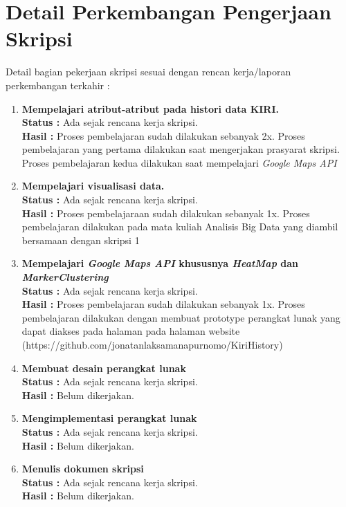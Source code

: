 \documentclass[a4paper,twoside]{article}
\begin{document}
\section{Detail Perkembangan Pengerjaan Skripsi}
Detail bagian pekerjaan skripsi sesuai dengan rencan kerja/laporan perkembangan terkahir :
	\begin{enumerate}
		\item \textbf{Mempelajari atribut-atribut pada histori data KIRI.}\\
		{\bf Status :} Ada sejak rencana kerja skripsi.\\
		{\bf Hasil :} Proses pembelajaran sudah dilakukan sebanyak 2x. Proses pembelajaran yang pertama dilakukan saat mengerjakan prasyarat skripsi. Proses pembelajaran kedua dilakukan saat mempelajari \textit{Google Maps API}
		
		\item \textbf{Mempelajari visualisasi data.}\\
		{\bf Status :} Ada sejak rencana kerja skripsi.\\
		{\bf Hasil :} Proses pembelajaraan sudah dilakukan sebanyak 1x. Proses pembelajaran dilakukan pada mata kuliah Analisis Big Data yang diambil bersamaan dengan skripsi 1

		\item \textbf{Mempelajari \textit{Google Maps API}  khususnya \textit{HeatMap} dan \textit{MarkerClustering}}\\
		{\bf Status :} Ada sejak rencana kerja skripsi.\\
		{\bf Hasil :} Proses pembelajaran sudah dilakukan sebanyak 1x. Proses pembelajaran dilakukan dengan membuat prototype perangkat lunak yang dapat diakses pada halaman pada halaman website (https://github.com/jonatanlaksamanapurnomo/KiriHistory)

		\item \textbf{Membuat desain perangkat lunak}\\
		{\bf Status :} Ada sejak rencana kerja skripsi.\\
		{\bf Hasil :} Belum dikerjakan.

		\item \textbf{Mengimplementasi perangkat lunak}\\
		{\bf Status :} Ada sejak rencana kerja skripsi.\\
		{\bf Hasil :} Belum dikerjakan.

		\item \textbf{Menulis dokumen skripsi} \\
		{\bf Status :} Ada sejak rencana kerja skripsi.\\
		{\bf Hasil :} Belum dikerjakan.

	\end{enumerate}
\end{document}
